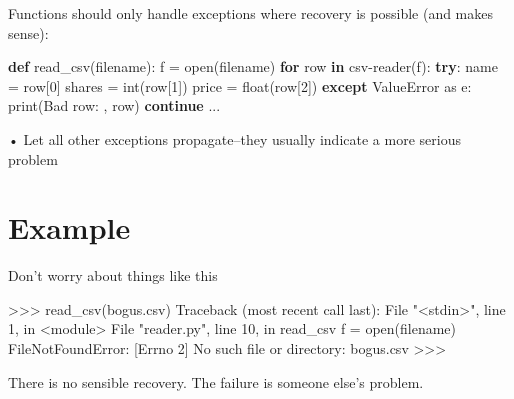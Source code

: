 \documentclass[
  letterpaper,
  DIV=11,
  numbers=noendperiod]{scrreprt}
\newenvironment{Shaded}{\begin{snugshade}}{\end{snugshade}}
\newcommand{\BuiltInTok}[1]{\textcolor[rgb]{0.00,0.23,0.31}{#1}}
\newcommand{\ControlFlowTok}[1]{\textcolor[rgb]{0.00,0.23,0.31}{\textbf{#1}}}
\newcommand{\DecValTok}[1]{\textcolor[rgb]{0.68,0.00,0.00}{#1}}
\newcommand{\ImportTok}[1]{\textcolor[rgb]{0.00,0.46,0.62}{#1}}
\newcommand{\KeywordTok}[1]{\textcolor[rgb]{0.00,0.23,0.31}{\textbf{#1}}}
\newcommand{\NormalTok}[1]{\textcolor[rgb]{0.00,0.23,0.31}{#1}}
\newcommand{\OperatorTok}[1]{\textcolor[rgb]{0.37,0.37,0.37}{#1}}
\newcommand{\PreprocessorTok}[1]{\textcolor[rgb]{0.68,0.00,0.00}{#1}}
\newcommand{\StringTok}[1]{\textcolor[rgb]{0.13,0.47,0.30}{#1}}
\begin{document}
Functions should only handle exceptions where recovery is possible (and
makes sense):

\begin{Shaded}
\begin{Highlighting}[]
\KeywordTok{def}\NormalTok{ read\_csv(filename):}
\NormalTok{    f }\OperatorTok{=} \BuiltInTok{open}\NormalTok{(filename)}
    \ControlFlowTok{for}\NormalTok{ row }\KeywordTok{in}\NormalTok{ csv}\OperatorTok{{-}}\NormalTok{reader(f):}
        \ControlFlowTok{try}\NormalTok{:}
\NormalTok{            name }\OperatorTok{=}\NormalTok{ row[}\DecValTok{0}\NormalTok{]}
\NormalTok{            shares }\OperatorTok{=} \BuiltInTok{int}\NormalTok{(row[}\DecValTok{1}\NormalTok{])}
\NormalTok{            price }\OperatorTok{=} \BuiltInTok{float}\NormalTok{(row[}\DecValTok{2}\NormalTok{])}
        \ControlFlowTok{except} \PreprocessorTok{ValueError} \ImportTok{as}\NormalTok{ e:}
            \BuiltInTok{print}\NormalTok{(}\StringTok{\textquotesingle{}Bad row: \textquotesingle{}}\NormalTok{, row)}
        \ControlFlowTok{continue}
\NormalTok{    ... }
\end{Highlighting}
\end{Shaded}

• Let all other exceptions propagate--they usually indicate a more
serious problem


\chapter{Example}\label{example-3}

Don't worry about things like this

\begin{Shaded}
\begin{Highlighting}[]
\NormalTok{\textgreater{}\textgreater{}\textgreater{} read\_csv(\textquotesingle{}bogus.csv\textquotesingle{})   }
\NormalTok{Traceback (most recent call last): File "\textless{}stdin\textgreater{}", line 1, in \textless{}module\textgreater{} File "reader.py", line 10, in read\_csv f = open(filename)   }
\NormalTok{FileNotFoundError: [Errno 2] No such file or directory: \textquotesingle{}bogus.csv\textquotesingle{}   }
\NormalTok{\textgreater{}\textgreater{}\textgreater{} }
\end{Highlighting}
\end{Shaded}

There is no sensible recovery. The failure is someone else's problem.
\end{document}
